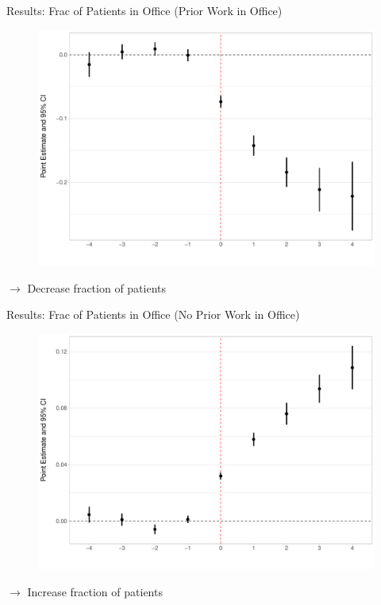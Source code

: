 \documentclass[10pt]{beamer}
\begin{document}
\begin{frame}{Results: Frac of Patients in Office (Prior Work in Office)}
\begin{figure}[ht]
\centering
\includegraphics[scale=.35]{Objects/Presentation_frac_prior_all.pdf}
\end{figure}
$\rightarrow$ Decrease fraction of patients
\end{frame}

\begin{frame}{Results: Frac of Patients in Office (No Prior Work in Office)}
\begin{figure}[ht]
\centering
\includegraphics[scale=.35]{Objects/Presentation_frac_noprior_all.pdf}
\end{figure}
$\rightarrow$ Increase fraction of patients
\end{frame}
\end{document}

